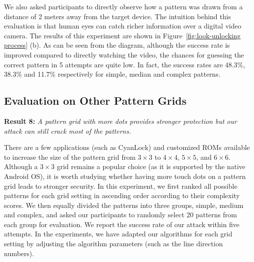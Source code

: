     We also asked participants to directly observe how a pattern was drawn
    from a distance of 2 meters away from the target device. The intuition
    behind this evaluation is that human eyes can catch richer information
    over a digital video camera. The results of this experiment are shown in
    Figure~\ref{fig:look-unlocking process} (b).  As can be seen from the
    diagram, although the success rate is improved compared to directly watching the video, the chances for guessing the correct pattern in
    5 attempts are quite low. In
    fact, the success rates are 48.3\%, 38.3\%
    and 11.7\% respectively for simple, median and complex patterns.

    \subsection{Evaluation on Other Pattern Grids\label{sec:scalability}}
    \noindent \textbf{Result 8:} \emph{A pattern grid with more dots provides stronger protection but our attack can still crack most of the patterns.}

        There are a few applications (such as CyanLock) and customized ROMs available to increase the size of the pattern grid from $3\times3$ to $4\times4$, $5\times5$, and $6\times6$.
        Although a $3 \times 3$ grid remains
        a popular choice (as it is supported by the native Android OS), it is worth studying whether
        having more touch dots on a pattern grid leads to stronger security. In this
        experiment, we first ranked all possible patterns for each grid setting in
        ascending order according to their complexity scores. We then equally
        divided the patterns into three groups, simple, medium and complex,
        and asked our participants to randomly select 20 patterns from each group for evaluation. We
        report the success rate of our attack within five attempts. In the experiments, we have adapted our algorithms for each grid setting
        by adjusting the algorithm parameters (such as the line direction numbers).


